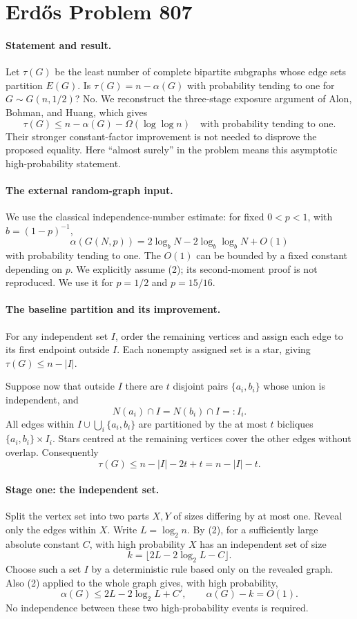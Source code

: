 \section*{Erd\H{o}s Problem 807}

\paragraph{Statement and result.}
Let \(\tau(G)\) be the least number of complete bipartite subgraphs whose edge sets partition \(E(G)\). Is \(\tau(G)=n-\alpha(G)\) with probability tending to one for \(G\sim G(n,1/2)\)? No. We reconstruct the three-stage exposure argument of Alon, Bohman, and Huang, which gives
\[
 \tau(G)\leq n-\alpha(G)-\Omega(\log\log n)
 \quad\text{with probability tending to one}.
\tag{1}
\]
Their stronger constant-factor improvement is not needed to disprove the proposed equality. Here ``almost surely'' in the problem means this asymptotic high-probability statement.

\paragraph{The external random-graph input.}
We use the classical independence-number estimate: for fixed \(0<p<1\), with \(b=(1-p)^{-1}\),
\[
 \alpha(G(N,p))=2\log_bN-2\log_b\log_bN+O(1)
\tag{2}
\]
with probability tending to one. The \(O(1)\) can be bounded by a fixed constant depending on \(p\). We explicitly assume (2); its second-moment proof is not reproduced. We use it for \(p=1/2\) and \(p=15/16\).

\paragraph{The baseline partition and its improvement.}
For any independent set \(I\), order the remaining vertices and assign each edge to its first endpoint outside \(I\). Each nonempty assigned set is a star, giving \(\tau(G)\leq n-|I|\).

Suppose now that outside \(I\) there are \(t\) disjoint pairs \(\{a_i,b_i\}\) whose union is independent, and
\[
 N(a_i)\cap I=N(b_i)\cap I=:I_i.
\tag{3}
\]
All edges within \(I\cup\bigcup_i\{a_i,b_i\}\) are partitioned by the at most \(t\) bicliques \(\{a_i,b_i\}\times I_i\). Stars centred at the remaining vertices cover the other edges without overlap. Consequently
\[
 \tau(G)\leq n-|I|-2t+t=n-|I|-t.
\tag{4}
\]

\paragraph{Stage one: the independent set.}
Split the vertex set into two parts \(X,Y\) of sizes differing by at most one. Reveal only the edges within \(X\). Write \(L=\log_2 n\). By (2), for a sufficiently large absolute constant \(C\), with high probability \(X\) has an independent set of size
\[
 k=\lfloor2L-2\log_2L-C\rfloor.
\]
Choose such a set \(I\) by a deterministic rule based only on the revealed graph. Also (2) applied to the whole graph gives, with high probability,
\[
 \alpha(G)\leq2L-2\log_2L+C',
 \qquad \alpha(G)-k=O(1).
\tag{5}
\]
No independence between these two high-probability events is required.

